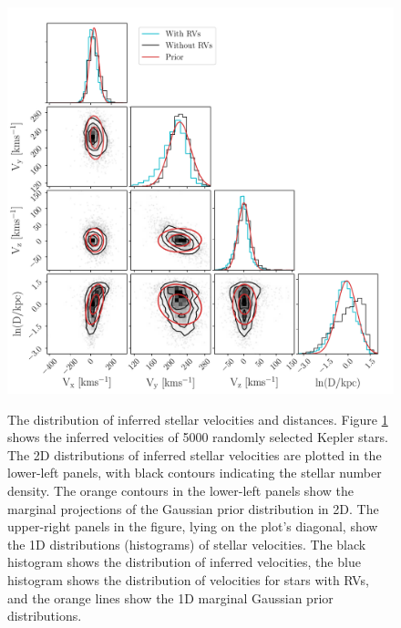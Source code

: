 
\begin{figure}[ht!]
\caption{
The distribution of inferred stellar velocities and distances.
    Figure \ref{fig:results} shows the inferred velocities of 5000 randomly
selected Kepler stars.
The 2D distributions of inferred stellar velocities are plotted in the
lower-left panels, with black contours indicating the stellar number density.
The orange contours in the lower-left panels show the marginal projections of
    the Gaussian prior distribution in 2D.
The upper-right panels in the figure, lying on the plot's diagonal, show the
    1D distributions (histograms) of stellar velocities.
The black histogram shows the distribution of inferred velocities, the blue
histogram shows the distribution of velocities for stars with RVs,
and the orange lines show the 1D marginal Gaussian prior distributions.
}
  \centering
    \includegraphics[width=1\textwidth]{results}
\label{fig:results}
\end{figure}
